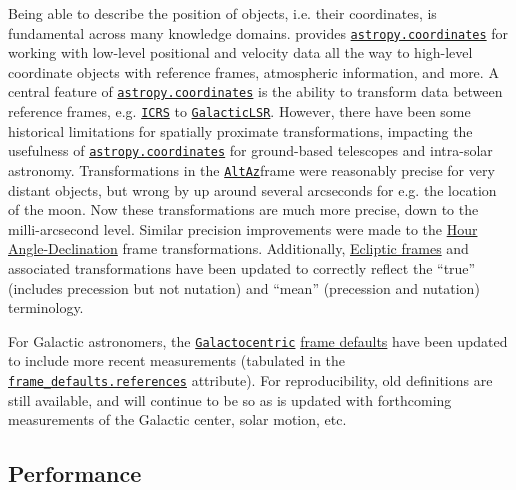 \documentclass[modern]{aastex631}
\newcommand{\astropysubpkg}[1]{\href{http://docs.astropy.org/en/stable/#1/index.html}{\texttt{astropy.#1}}\xspace}
\newcommand{\astropycoordinates}{\astropysubpkg{coordinates}}
\newcommand{\astropyapi}[2]{\href{https://docs.astropy.org/en/stable/api/astropy.#1.html}{#2}}
\newcommand{\astropyapidoc}[2]{\astropyapi{#1}{\texttt{#2}\xspace}}
\newcommand{\astropyICRS}{\astropyapidoc{coordinates.builtin_frames.ICRS}{ICRS}}
\newcommand{\astropyGalacticLSR}{\astropyapidoc{coordinates.builtin_frames.
GalacticLSR}{GalacticLSR}}
\newcommand{\astropyAltAz}{\astropyapidoc{coordinates.builtin_frames.AltAz}{AltAz}}
\newcommand{\astropyGalactocentric}{\astropyapidoc{coordinates.builtin_frames.Galactocentric}{Galactocentric}}
\newcommand{\astropyScienceState}{\astropyapidoc{utils.state.ScienceState}{ScienceState}}
\begin{document}
    Being able to describe the position of objects, i.e. their coordinates, is
    fundamental across many knowledge domains. \astropypkg provides
    \astropycoordinates for working with low-level positional and velocity data
    all the way to high-level coordinate objects with reference frames,
    atmospheric information, and more. A central feature of \astropycoordinates is
    the ability to transform data between reference frames, e.g. \astropyICRS
    \citep{ICRS:1997} to \astropyGalacticLSR \citep{GalacticLSR:2010}. However,
    there have been some historical limitations for spatially proximate
    transformations, impacting the usefulness of \astropycoordinates for
    ground-based telescopes and intra-solar astronomy. Transformations in the
    \astropyAltAz frame were reasonably precise for very distant objects, but
    wrong by up around several arcseconds for e.g. the location of the moon. Now
    these transformations are much more precise, down to the milli-arcsecond
    level. Similar precision improvements were made to the
    \astropyapi{coordinates.builtin_frames.HADec}{Hour Angle-Declination} frame
    transformations. Additionally,
    \astropyapi{coordinates.builtin_frames.BaseEclipticFrame}{Ecliptic frames}
    and associated transformations have been updated to correctly reflect the
    “true” (includes precession but not nutation) and “mean” (precession and
    nutation) terminology.

    For Galactic astronomers, the \astropyGalactocentric
    \astropyapi{coordinates.galactocentric_frame_defaults}{frame defaults} have
    been updated to include more recent measurements (tabulated in the
    \href{https://docs.astropy.org/en/stable/api/astropy.coordinates.galactocentric_frame_defaults.html#astropy.coordinates.galactocentric_frame_defaults.references}{\texttt{frame\_defaults.references}}
    attribute). For reproducibility, old definitions are still available, and will
    continue to be so as \astropypkg is updated with forthcoming measurements of
    the Galactic center, solar motion, etc.


\subsection*{Performance} \label{sec:core-features-performance}
\end{document}

